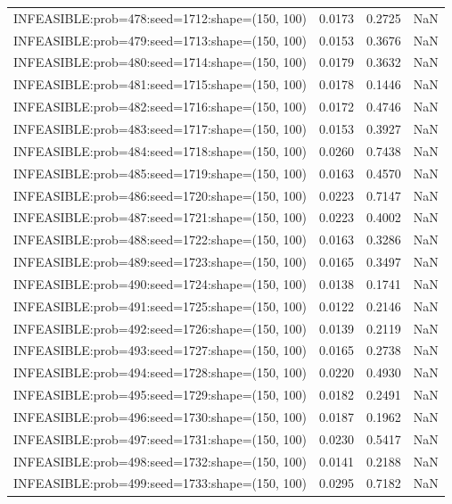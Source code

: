 \begin{longtable}{lccc}
INFEASIBLE:prob=478:seed=1712:shape=(150, 100) &   0.0173 &  0.2725 &    NaN \\
INFEASIBLE:prob=479:seed=1713:shape=(150, 100) &   0.0153 &  0.3676 &    NaN \\
INFEASIBLE:prob=480:seed=1714:shape=(150, 100) &   0.0179 &  0.3632 &    NaN \\
INFEASIBLE:prob=481:seed=1715:shape=(150, 100) &   0.0178 &  0.1446 &    NaN \\
INFEASIBLE:prob=482:seed=1716:shape=(150, 100) &   0.0172 &  0.4746 &    NaN \\
INFEASIBLE:prob=483:seed=1717:shape=(150, 100) &   0.0153 &  0.3927 &    NaN \\
INFEASIBLE:prob=484:seed=1718:shape=(150, 100) &   0.0260 &  0.7438 &    NaN \\
INFEASIBLE:prob=485:seed=1719:shape=(150, 100) &   0.0163 &  0.4570 &    NaN \\
INFEASIBLE:prob=486:seed=1720:shape=(150, 100) &   0.0223 &  0.7147 &    NaN \\
INFEASIBLE:prob=487:seed=1721:shape=(150, 100) &   0.0223 &  0.4002 &    NaN \\
INFEASIBLE:prob=488:seed=1722:shape=(150, 100) &   0.0163 &  0.3286 &    NaN \\
INFEASIBLE:prob=489:seed=1723:shape=(150, 100) &   0.0165 &  0.3497 &    NaN \\
INFEASIBLE:prob=490:seed=1724:shape=(150, 100) &   0.0138 &  0.1741 &    NaN \\
INFEASIBLE:prob=491:seed=1725:shape=(150, 100) &   0.0122 &  0.2146 &    NaN \\
INFEASIBLE:prob=492:seed=1726:shape=(150, 100) &   0.0139 &  0.2119 &    NaN \\
INFEASIBLE:prob=493:seed=1727:shape=(150, 100) &   0.0165 &  0.2738 &    NaN \\
INFEASIBLE:prob=494:seed=1728:shape=(150, 100) &   0.0220 &  0.4930 &    NaN \\
INFEASIBLE:prob=495:seed=1729:shape=(150, 100) &   0.0182 &  0.2491 &    NaN \\
INFEASIBLE:prob=496:seed=1730:shape=(150, 100) &   0.0187 &  0.1962 &    NaN \\
INFEASIBLE:prob=497:seed=1731:shape=(150, 100) &   0.0230 &  0.5417 &    NaN \\
INFEASIBLE:prob=498:seed=1732:shape=(150, 100) &   0.0141 &  0.2188 &    NaN \\
INFEASIBLE:prob=499:seed=1733:shape=(150, 100) &   0.0295 &  0.7182 &    NaN \\

\end{longtable}
